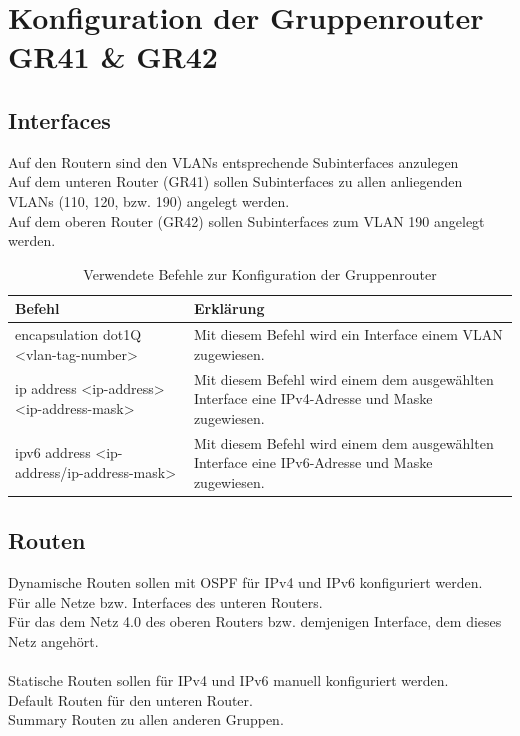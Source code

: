 \documentclass{article}
\begin{document}
\section{Konfiguration der Gruppenrouter GR41 \& GR42}

\subsection{Interfaces}
Auf den Routern sind den VLANs entsprechende Subinterfaces anzulegen\\
Auf dem unteren Router (GR41) sollen Subinterfaces zu allen anliegenden VLANs (110, 120, bzw. 190) angelegt werden.\\
Auf dem oberen Router (GR42) sollen Subinterfaces zum VLAN 190 angelegt werden.\\

\begin{table}[htbp]
    \centering
    \begin{tabularx}{\textwidth}{|X|X|}
        \toprule
        \textbf{Befehl} & \textbf{Erklärung} \\
        \midrule
        encapsulation dot1Q <vlan-tag-number> & Mit diesem Befehl wird ein Interface einem VLAN zugewiesen.\\
        \hline
        ip address <ip-address> <ip-address-mask> & Mit diesem Befehl wird einem dem ausgewählten Interface eine IPv4-Adresse und Maske zugewiesen.\\
        \hline
        ipv6 address <ip-address/ip-address-mask> & Mit diesem Befehl wird einem dem ausgewählten Interface eine IPv6-Adresse und Maske zugewiesen.\\
        \bottomrule
    \end{tabularx}
    \caption{Verwendete Befehle zur Konfiguration der Gruppenrouter}
    \label{tab:commands}
\end{table}

\pagebreak

\subsection{Routen}
Dynamische Routen sollen mit OSPF für IPv4 und IPv6 konfiguriert werden.\\
Für alle Netze bzw. Interfaces des unteren Routers.\\
Für das dem Netz 4.0 des oberen Routers bzw. demjenigen Interface, dem
dieses Netz angehört.\\
\\
Statische Routen sollen für IPv4 und IPv6 manuell konfiguriert werden.\\
Default Routen für den unteren Router.\\
Summary Routen zu allen anderen Gruppen.\\
\end{document}
